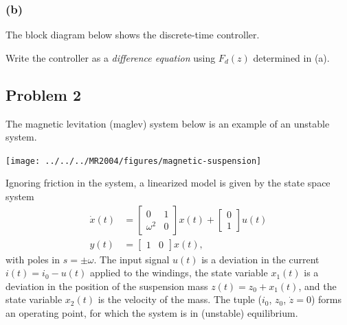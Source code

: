 \documentclass[letterpaper,12pt]{scrartcl}
\newcommand{\bbm}{\begin{bmatrix}}
\newcommand{\ebm}{\end{bmatrix}}
\newcommand{\bmpl}{\begin{minipage}[t]{\textwidth}}
\newcommand{\emp}{\end{minipage}}
\begin{document}
\subsubsection*{(b)}
The block diagram below shows the discrete-time controller.
\begin{center}
   \end{center}
Write the controller as a \emph{difference equation} using $F_d(z)$ determined in (a).

\noindent
\fbox{
\bmpl
{\bf Calculations and answer:}\\
\vspace*{64mm}
\emp}


\subsection*{Problem 2}

The magnetic levitation (maglev) system below is an example of an unstable system. 
\begin{center}
\texttt{[image: ../../../MR2004/figures/magnetic-suspension]}
\end{center}
Ignoring friction in the system, a linearized model is given by the state space system
\begin{equation}
\begin{aligned}
  \dot{x}(t) &= \bbm 0 & 1\\ \omega^2 & 0 \ebm x(t) + \bbm 0\\1 \ebm u(t)\\
  y(t) &= \bbm 1 & 0 \ebm x(t),
\end{aligned}
\label{eq:maglevcont}
\end{equation}
with poles in $s = \pm \omega$. The input signal $u(t)$ is a deviation in the current $i(t)=i_0-u(t)$ applied to the windings, the state variable $x_1(t)$ is a deviation in the position of the suspension mass $z(t) = z_0 + x_1(t)$, and the state variable $x_2(t)$ is the velocity of the mass. The tuple ($i_0$, $z_0$, $\dot{z}=0$) forms an operating point, for which the system is in (unstable) equilibrium. 
\end{document}
